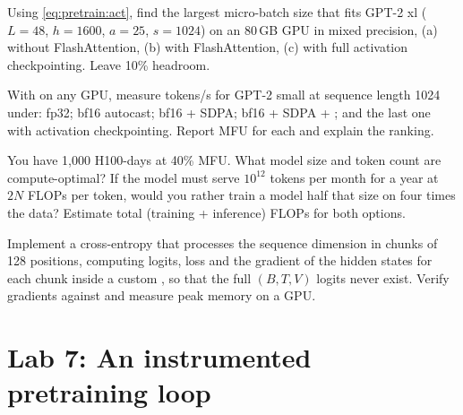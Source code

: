 \begin{exercise}
Using \cref{eq:pretrain:act}, find the largest micro-batch size that fits GPT-2 xl
($L=48$, $h=1600$, $a=25$, $s=1024$) on an 80\,GB GPU in mixed precision, (a) without
FlashAttention, (b) with FlashAttention, (c) with full activation checkpointing. Leave 10\%
headroom.
\end{exercise}

\begin{exercise}
With  on any GPU, measure tokens/s for GPT-2 small at sequence length 1024
under: fp32; bf16 autocast; bf16 + SDPA; bf16 + SDPA + ; and the last one
with activation checkpointing. Report MFU for each and explain the ranking.
\end{exercise}

\begin{exercise}
You have 1{,}000 H100-days at 40\% MFU. What model size and token count are compute-optimal?
If the model must serve $10^{12}$ tokens per month for a year at $2N$ FLOPs per token, would you
rather train a model half that size on four times the data? Estimate total (training +
inference) FLOPs for both options.
\end{exercise}

\begin{exercise}\label{ex:pretrain:chunked}
Implement a cross-entropy that processes the sequence dimension in chunks of 128 positions,
computing logits, loss and the gradient of the hidden states for each chunk inside a custom
, so that the full $(B,T,V)$ logits never exist. Verify gradients
against  and measure peak memory on a GPU.
\end{exercise}

\section{Lab 7: An instrumented pretraining loop}\label{sec:pretrain:lab}

